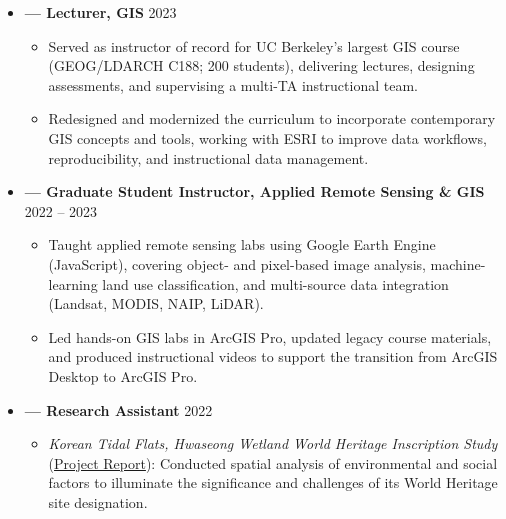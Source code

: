 \documentclass[a4paper,12pt]{article}
\begin{document}
\begin{itemize}[leftmargin=1.5em, label={}]
    \item \textbf{— Lecturer, GIS} \hfill 2023
    \begin{itemize}[nosep, leftmargin=1.2em, label=--]
        \item Served as instructor of record for UC Berkeley’s largest GIS course (GEOG/LDARCH C188; 200 students), delivering lectures, designing assessments, and supervising a multi-TA instructional team.
        \item Redesigned and modernized the curriculum to incorporate contemporary GIS concepts and tools, working with ESRI to improve data workflows, reproducibility, and instructional data management.
    \end{itemize}
    
    \vspace{3pt}

    \item \textbf{— Graduate Student Instructor, Applied Remote Sensing \& GIS} \hfill 2022 -- 2023
    \begin{itemize}[nosep, leftmargin=1.2em, label=--]
        \item Taught applied remote sensing labs using Google Earth Engine (JavaScript), covering object- and pixel-based image analysis, machine-learning land use classification, and multi-source data integration (Landsat, MODIS, NAIP, LiDAR).
        \item Led hands-on GIS labs in ArcGIS Pro, updated legacy course materials, and produced instructional videos to support the transition from ArcGIS Desktop to ArcGIS Pro.
    \end{itemize}

    \item \textbf{— Research Assistant} \hfill 2022
    \begin{itemize}[nosep, leftmargin=1.2em, label=--]
        \item \textit{Korean Tidal Flats, Hwaseong Wetland World Heritage Inscription Study} (\href{https://saveinternational.org/wp-content/uploads/2023/02/hwaseongwetlands_jan15th_2023.pdf}{Project Report}): Conducted spatial analysis of environmental and social factors to illuminate the significance and challenges of its World Heritage site designation.
    \end{itemize}
\end{itemize}
\end{document}
